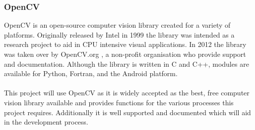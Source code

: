 	\subsubsection{OpenCV}
		OpenCV is an open-source computer vision library created for a variety of platforms. Originally released by Intel in 1999 \citep{bradski2008opencv} the library was intended as a research project to aid in CPU intensive visual applications. In 2012 the library was taken over by OpenCV.org \citep{opencvsite}, a non-profit organisation who provide support and  documentation. Although the library is written in C and C++, modules are available for Python, Fortran, and the Android platform.
		\\\\
		This project will use OpenCV as it is widely accepted as the best, free computer vision library available and provides functions for the various processes this project  requires. Additionally it is well supported and documented which will aid in the development process.

